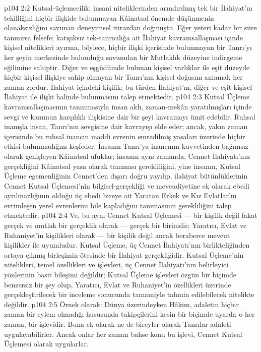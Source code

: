 \vs p104 2:2 Kutsal\hyp{}üçlemecilik; insani niteliklerinden arındırılmış tek bir İlahiyat’ın tekilliğini hiçbir ilişkide bulunmayan Kâinatsal önemde düşünmenin olanaksızlığını savunan deneyimsel itirazdan doğmuştu. Eğer yeteri kadar bir süre tanınırsa felsefe; katışıksız tek\hyp{}tanrıcılığa ait İlahiyat kavramsallaşması içinde kişisel nitelikleri ayırma, böylece, hiçbir ilişki içerisinde bulunmayan bir Tanrı’yı her şeyin merkezinde bulunduğu savunulan bir Mutlaklık düzeyine indirgeme eğilimine sahiptir. Diğer ve eşgüdümde bulunan kişisel varlıklar ile eşit düzeyde hiçbir kişisel ilişkiye sahip olmayan bir Tanrı’nın kişisel doğasını anlamak her zaman zordur. İlahiyat içindeki kişilik; bu türden İlahiyat’ın, diğer ve eşit kişisel İlahiyat ile ilişki halinde bulunmasını talep etmektedir.
\vs p104 2:3 Kutsal Üçleme kavramsallaşmasının tanınmasıyla insan aklı, zaman\hyp{}mekân yaratılmışları içinde sevgi ve kanunun karşılıklı ilişkisine dair bir şeyi kavramayı ümit edebilir. Ruhsal inanışla insan, Tanrı’nın sevgisine dair kavrayışı elde eder; ancak, yakın zaman içerisinde bu ruhsal inancın maddi evrenin emredilmiş yasaları üzerinde hiçbir etkisi bulunmadığını keşfeder. İnsanın Tanrı’ya inancının kuvvetinden bağımsız olarak genişleyen Kâinatsal ufuklar; insanın aynı zamanda, Cennet İlahiyatı’nın gerçekliğini Kâinatsal yasa olarak tanıması gerekliliğini, yine insanın, Kutsal Üçleme egemenliğinin Cennet’den dışarı doğru yayılıp, ilahiyat bütünlüklerinin Cennet Kutsal Üçlemesi’nin bilgisel\hyp{}gerçekliği ve mevcudiyetine ek olarak ebedi ayrılmazlığının  olduğu üç ebedi bireye ait Yaratan Erkek ve Kız Evlatlar’ın evrimleşen yerel evrenlerini bile kapladığını tanımasının gerekliliğini talep etmektedir.
\vs p104 2:4 Ve, bu aynı Cennet Kutsal Üçlemesi --- bir kişilik değil fakat gerçek ve mutlak bir gerçeklik olarak --- gerçek bir birimdir; Yaratıcı, Evlat ve Ruhaniyet’in kişilikleri olarak --- bir kişilik değil ancak beraberce mevcut kişilikler ile uyumludur. Kutsal Üçleme, üç Cennet İlahiyatı’nın birlikteliğinden ortaya çıkmış birleşimin\hyp{}ötesinde bir İlahiyat gerçekliğidir. Kutsal Üçleme’nin nitelikleri, temel özellikleri ve işlevleri, üç Cennet İlahiyatı’nın belirleyici yönlerinin basit bileşimi değildir; Kutsal Üçleme işlevleri özgün bir biçimde benzersiz bir şey olup, Yaratıcı, Evlat ve Ruhaniyet’in özellikleri üzerinde gerçekleştirilecek bir inceleme sonucunda tamamiyle tahmin edilebilecek nitelikte değildir.
\vs p104 2:5 Örnek olarak: Dünya üzerindeyken Hâkim, adaletin hiçbir zaman bir  eylem olmadığı hususunda takipçilerini kesin bir biçimde uyardı; o her zaman, bir  işlevidir. Buna ek olarak ne de bireyler olarak Tanrılar adaleti uygulayabilirler. Ancak onlar her zaman bahse konu bu işlevi, Cennet Kutsal Üçlemesi olarak uygularlar.
